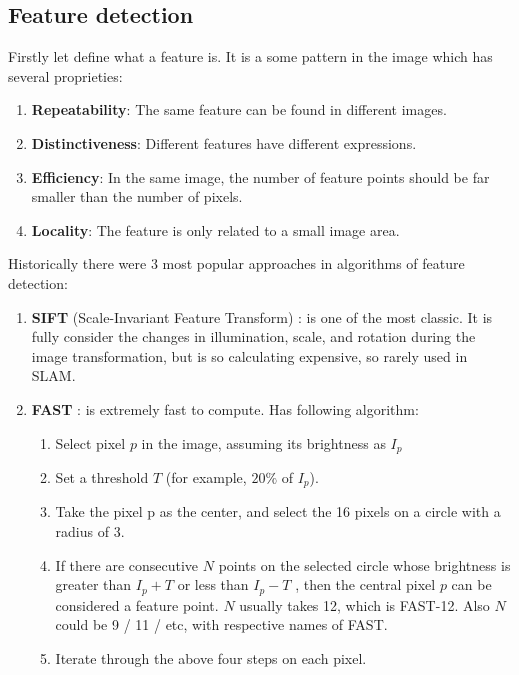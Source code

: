 \subsection{Feature detection}
Firstly let define what a feature is. It is a some pattern in the image which has several proprieties:
\begin{enumerate}
    \item {\bf Repeatability}: The same feature can be found in different images.
    \item {\bf Distinctiveness}: Different features have different expressions.
    \item {\bf Efficiency}: In the same image, the number of feature points should be far smaller than the number of pixels.
    \item {\bf Locality}: The feature is only related to a small image area.
\end{enumerate}

Historically there were 3 most popular approaches in algorithms of feature detection:
\begin{enumerate}
    \item {\bf  SIFT} (Scale-Invariant Feature Transform) : is one of the most classic. It is fully consider the changes in illumination, scale, and rotation during the image transformation, but is so calculating expensive, so rarely used in SLAM.

    \item {\bf FAST} : is extremely fast to compute. Has following algorithm:
    \begin{enumerate}
        \item Select pixel $p$ in the image, assuming its brightness as $I_p$
        \item Set a threshold $T$ (for example, $20\%$ of $I_p$).
        \item Take the pixel p as the center, and select the 16 pixels on a circle with a radius of 3.
        \item If there are consecutive $N$ points on the selected circle whose brightness is greater than $I_p+T$ or less than $I_p−T$ , then the central pixel $p$ can be considered a feature point. $N$ usually takes 12, which is {\br FAST-12}. Also $N$ could be 9 / 11 / etc, with respective names of FAST.
        \item Iterate through the above four steps on each pixel.
    \end{enumerate}
    
\end{enumerate}
    
